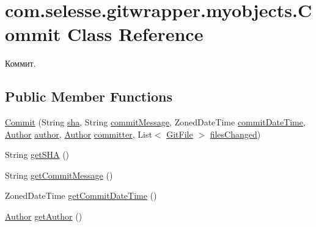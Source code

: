 \hypertarget{classcom_1_1selesse_1_1gitwrapper_1_1myobjects_1_1_commit}{}\section{com.\+selesse.\+gitwrapper.\+myobjects.\+Commit Class Reference}
\label{classcom_1_1selesse_1_1gitwrapper_1_1myobjects_1_1_commit}


Коммит.  


\subsection*{Public Member Functions}
\begin{DoxyCompactItemize}
\item 
\hyperlink{classcom_1_1selesse_1_1gitwrapper_1_1myobjects_1_1_commit_ac72033557306edc2a95f19e5cd6b4d8b}{Commit} (String \hyperlink{classcom_1_1selesse_1_1gitwrapper_1_1myobjects_1_1_commit_a0922f957c3a176404df5610c4922eb93}{sha}, String \hyperlink{classcom_1_1selesse_1_1gitwrapper_1_1myobjects_1_1_commit_a54013a7145d48c39c9bde8b96bc1ba00}{commit\+Message}, Zoned\+Date\+Time \hyperlink{classcom_1_1selesse_1_1gitwrapper_1_1myobjects_1_1_commit_a8432dcda5824fb1ec915cf58c97e55e6}{commit\+Date\+Time}, \hyperlink{classcom_1_1selesse_1_1gitwrapper_1_1myobjects_1_1_author}{Author} \hyperlink{classcom_1_1selesse_1_1gitwrapper_1_1myobjects_1_1_commit_ac3bb0d4518fc2b0e7c59190f68639482}{author}, \hyperlink{classcom_1_1selesse_1_1gitwrapper_1_1myobjects_1_1_author}{Author} \hyperlink{classcom_1_1selesse_1_1gitwrapper_1_1myobjects_1_1_commit_a1da6ac2512ea029bcb33054d18dcbf33}{committer}, List$<$ \hyperlink{classcom_1_1selesse_1_1gitwrapper_1_1myobjects_1_1_git_file}{Git\+File} $>$ \hyperlink{classcom_1_1selesse_1_1gitwrapper_1_1myobjects_1_1_commit_a4e94c2e615e45c49cde7814aa2ecdd7e}{files\+Changed})
\item 
String \hyperlink{classcom_1_1selesse_1_1gitwrapper_1_1myobjects_1_1_commit_a21f2fe035bb2089e9eb6bd788302c9ae}{get\+S\+HA} ()
\item 
String \hyperlink{classcom_1_1selesse_1_1gitwrapper_1_1myobjects_1_1_commit_a0224b0aff5c1be39393a3da9017be3e6}{get\+Commit\+Message} ()
\item 
Zoned\+Date\+Time \hyperlink{classcom_1_1selesse_1_1gitwrapper_1_1myobjects_1_1_commit_aa4afbdb30cb4f5a8da15eeee7153a9be}{get\+Commit\+Date\+Time} ()
\item 
\hyperlink{classcom_1_1selesse_1_1gitwrapper_1_1myobjects_1_1_author}{Author} \hyperlink{classcom_1_1selesse_1_1gitwrapper_1_1myobjects_1_1_commit_a0cd10888989f76abdf6e8d3eb76e92be}{get\+Author} ()

\end{DoxyCompactItemize}
